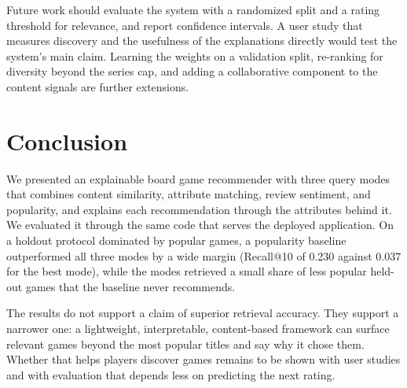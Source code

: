 \documentclass[conference]{IEEEtran}
\begin{document}
Future work should evaluate the system with a randomized split and a rating threshold for relevance, and report confidence intervals. A user study that measures discovery and the usefulness of the explanations directly would test the system's main claim. Learning the weights on a validation split, re-ranking for diversity beyond the series cap, and adding a collaborative component to the content signals are further extensions.

\section{Conclusion}

We presented an explainable board game recommender with three query modes that combines content similarity, attribute matching, review sentiment, and popularity, and explains each recommendation through the attributes behind it. We evaluated it through the same code that serves the deployed application. On a holdout protocol dominated by popular games, a popularity baseline outperformed all three modes by a wide margin (Recall@10 of 0.230 against 0.037 for the best mode), while the modes retrieved a small share of less popular held-out games that the baseline never recommends.

The results do not support a claim of superior retrieval accuracy. They support a narrower one: a lightweight, interpretable, content-based framework can surface relevant games beyond the most popular titles and say why it chose them. Whether that helps players discover games remains to be shown with user studies and with evaluation that depends less on predicting the next rating.



\end{document}
